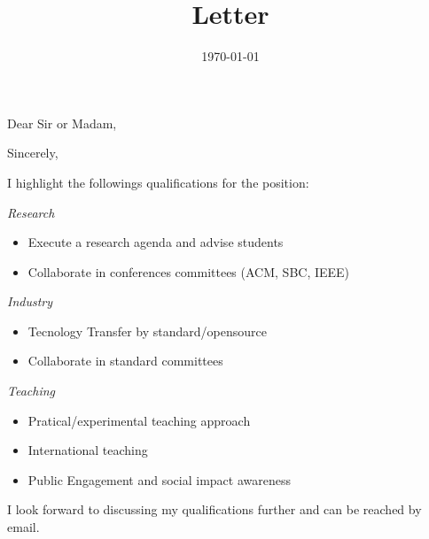 \documentclass[10pt,a4paper,sans,colorlinks]{moderncv}
\title{Letter}
\begin{document}
\hfHyperrefSetupBlueLinks

\recipient{\ }{}
\opening{Dear Sir or Madam,}
\date{\today}
\closing{Sincerely,}

\makelettertitle

\justify


I highlight the followings qualifications for the position:

\textit{Research}
  \begin{itemize}[mynosep]
    \item Execute a research agenda and advise students
    \item Collaborate in conferences committees (ACM, SBC, IEEE)
  \end{itemize}

\textit{Industry}
  \begin{itemize}[mynosep]
    \item Tecnology Transfer by standard/opensource
    \item Collaborate in standard committees
  \end{itemize}

\textit{Teaching}
  \begin{itemize}[mynosep]
    \item Pratical/experimental teaching approach
    \item International teaching
    \item Public Engagement and social impact awareness
  \end{itemize}

I look forward to discussing my qualifications further and can be reached by email.

\makeletterclosing
\end{document}
